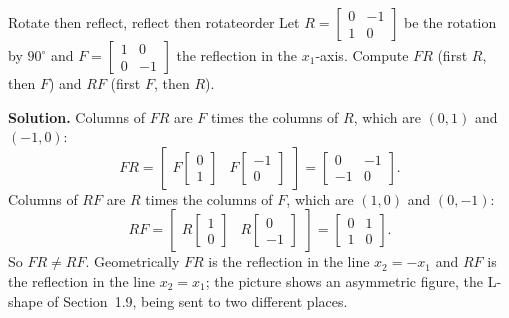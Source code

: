 \documentclass[11pt]{article}
\begin{document}
\begin{exmp}{Rotate then reflect, reflect then rotate}{order}
Let $R=\begin{bmatrix}0&-1\\1&0\end{bmatrix}$ be the rotation by $90^\circ$ and $F=\begin{bmatrix}1&0\\0&-1\end{bmatrix}$ the reflection in the $x_1$-axis. Compute $FR$ (first $R$, then $F$) and $RF$ (first $F$, then $R$).

\textbf{Solution.} Columns of $FR$ are $F$ times the columns of $R$, which are $(0,1)$ and $(-1,0)$:
\[
FR=\begin{bmatrix}F\begin{bmatrix}0\\1\end{bmatrix}&F\begin{bmatrix}-1\\0\end{bmatrix}\end{bmatrix}=\begin{bmatrix}0&-1\\-1&0\end{bmatrix}.
\]
Columns of $RF$ are $R$ times the columns of $F$, which are $(1,0)$ and $(0,-1)$:
\[
RF=\begin{bmatrix}R\begin{bmatrix}1\\0\end{bmatrix}&R\begin{bmatrix}0\\-1\end{bmatrix}\end{bmatrix}=\begin{bmatrix}0&1\\1&0\end{bmatrix}.
\]
So $FR\neq RF$. Geometrically $FR$ is the reflection in the line $x_2=-x_1$ and $RF$ is the reflection in the line $x_2=x_1$; the picture shows an asymmetric figure, the L-shape of Section~1.9, being sent to two different places.
\end{exmp}
\end{document}
